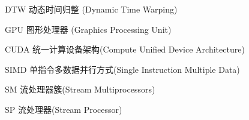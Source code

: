 \begin{denotation}[3cm]
\item[DTW] 动态时间归整 (Dynamic Time Warping)
\item[GPU] 图形处理器 (Graphics Processing Unit)
\item[CUDA] 统一计算设备架构(Compute Unified Device Architecture)
\item[SIMD] 单指令多数据并行方式(Single Instruction Multiple Data)
\item[SM] 流处理器簇(Stream Multiprocessors)
\item[SP] 流处理器(Stream Processor)

\end{denotation}

